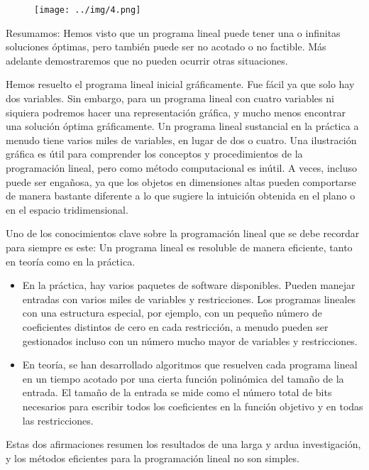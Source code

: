 \documentclass{article}
\begin{document}
\begin{figure}[H] %
\centering %
\texttt{[image: ../img/4.png]} %
\label{fig:imagen} %
\end{figure}

Resumamos: Hemos visto que un programa lineal puede tener una o infinitas soluciones óptimas, pero también puede ser no acotado o no factible. Más adelante demostraremos que no pueden ocurrir otras situaciones.

Hemos resuelto el programa lineal inicial gráficamente. Fue fácil ya que solo hay dos variables. Sin embargo, para un programa lineal con cuatro variables ni siquiera podremos hacer una representación gráfica, y mucho menos encontrar una solución óptima gráficamente. Un programa lineal sustancial en la práctica a menudo tiene varios miles de variables, en lugar de dos o cuatro. Una ilustración gráfica es útil para comprender los conceptos y procedimientos de la programación lineal, pero como método computacional es inútil. A veces, incluso puede ser engañosa, ya que los objetos en dimensiones altas pueden comportarse de manera bastante diferente a lo que sugiere la intuición obtenida en el plano o en el espacio tridimensional.

Uno de los conocimientos clave sobre la programación lineal que se debe recordar para siempre es este:
Un programa lineal es resoluble de manera eficiente, tanto en teoría como en la práctica.
\begin{itemize}
    \item En la práctica, hay varios paquetes de software disponibles. Pueden manejar entradas con varios miles de variables y restricciones. Los programas lineales con una estructura especial, por ejemplo, con un pequeño número de coeficientes distintos de cero en cada restricción, a menudo pueden ser gestionados incluso con un número mucho mayor de variables y restricciones.
    \item En teoría, se han desarrollado algoritmos que resuelven cada programa lineal en un tiempo acotado por una cierta función polinómica del tamaño de la entrada. El tamaño de la entrada se mide como el número total de bits necesarios para escribir todos los coeficientes en la función objetivo y en todas las restricciones.
\end{itemize}
Estas dos afirmaciones resumen los resultados de una larga y ardua investigación, y los métodos eficientes para la programación lineal no son simples.
\end{document}
